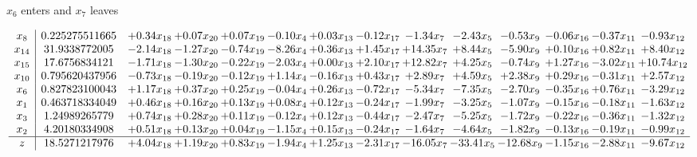 \documentclass[8pt]{article}
\begin{document}
 $ x_{6} $ enters and $ x_{7} $ leaves 

 \[\begin{array}{c| c c@{\hskip 2pt} c@{\hskip 2pt} c@{\hskip 2pt} c@{\hskip 2pt} c@{\hskip 2pt} c@{\hskip 2pt} c@{\hskip 2pt} c@{\hskip 2pt} c@{\hskip 2pt} c@{\hskip 2pt} c@{\hskip 2pt} c@{\hskip 2pt} }
 x_{8}   &  0.225275511665 & +  0.34 x_{18} & +  0.07 x_{20} & +  0.07 x_{19} & -0.10 x_{4} & +  0.03 x_{13} & -0.12 x_{17} & -1.34 x_{7} & -2.43 x_{5} & -0.53 x_{9} & -0.06 x_{16} & -0.37 x_{11} & -0.93 x_{12}\\
 x_{14}   &  31.9338772005 & -2.14 x_{18} & -1.27 x_{20} & -0.74 x_{19} & -8.26 x_{4} & +  0.36 x_{13} & +  1.45 x_{17} & + 14.35 x_{7} & +  8.44 x_{5} & -5.90 x_{9} & +  0.10 x_{16} & +  0.82 x_{11} & +  8.40 x_{12}\\
 x_{15}   &  17.6756834121 & -1.71 x_{18} & -1.30 x_{20} & -0.22 x_{19} & -2.03 x_{4} & +  0.00 x_{13} & +  2.10 x_{17} & + 12.82 x_{7} & +  4.25 x_{5} & -0.74 x_{9} & +  1.27 x_{16} & -3.02 x_{11} & + 10.74 x_{12}\\
 x_{10}   &  0.795620437956 & -0.73 x_{18} & -0.19 x_{20} & -0.12 x_{19} & +  1.14 x_{4} & -0.16 x_{13} & +  0.43 x_{17} & +  2.89 x_{7} & +  4.59 x_{5} & +  2.38 x_{9} & +  0.29 x_{16} & -0.31 x_{11} & +  2.57 x_{12}\\
 x_{6}   &  0.827823100043 & +  1.17 x_{18} & +  0.37 x_{20} & +  0.25 x_{19} & -0.04 x_{4} & +  0.26 x_{13} & -0.72 x_{17} & -5.34 x_{7} & -7.35 x_{5} & -2.70 x_{9} & -0.35 x_{16} & +  0.76 x_{11} & -3.29 x_{12}\\
 x_{1}   &  0.463718334049 & +  0.46 x_{18} & +  0.16 x_{20} & +  0.13 x_{19} & +  0.08 x_{4} & +  0.12 x_{13} & -0.24 x_{17} & -1.99 x_{7} & -3.25 x_{5} & -1.07 x_{9} & -0.15 x_{16} & -0.18 x_{11} & -1.63 x_{12}\\
 x_{3}   &  1.24989265779 & +  0.74 x_{18} & +  0.28 x_{20} & +  0.11 x_{19} & -0.12 x_{4} & +  0.12 x_{13} & -0.44 x_{17} & -2.47 x_{7} & -5.25 x_{5} & -1.72 x_{9} & -0.22 x_{16} & -0.36 x_{11} & -1.32 x_{12}\\
 x_{2}   &  4.20180334908 & +  0.51 x_{18} & +  0.13 x_{20} & +  0.04 x_{19} & -1.15 x_{4} & +  0.15 x_{13} & -0.24 x_{17} & -1.64 x_{7} & -4.64 x_{5} & -1.82 x_{9} & -0.13 x_{16} & -0.19 x_{11} & -0.99 x_{12}\\
\hline
z    &  18.5271217976 & +  4.04 x_{18} & +  1.19 x_{20} & +  0.83 x_{19} & -1.94 x_{4} & +  1.25 x_{13} & -2.31 x_{17} & -16.05 x_{7} & -33.41 x_{5} & -12.68 x_{9} & -1.15 x_{16} & -2.88 x_{11} & -9.67 x_{12}\\
\end{array}\]
\end{document}
